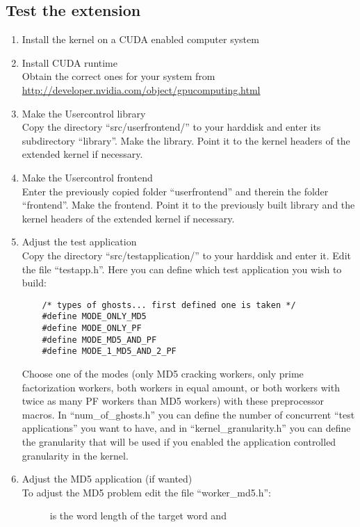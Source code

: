 \subsection{Test the extension}
\begin{enumerate}
\item  Install the kernel on a CUDA enabled computer system
\item  Install CUDA runtime\\
  Obtain the correct
  ones for your system from \url{http://developer.nvidia.com/object/gpucomputing.html}
\item  Make the Usercontrol library\\
  Copy the directory ``src/userfrontend/'' to your harddisk and enter its
  subdirectory ``library''. Make the library. Point it to the kernel headers of
  the extended kernel if necessary.
\item  Make the Usercontrol frontend\\
  Enter the previously copied folder ``userfrontend'' and therein the folder
  ``frontend''. Make the frontend. Point it to the previously built library and
  the kernel headers of the extended kernel if necessary.
\item  Adjust the test application\\
  Copy the directory ``src/testapplication/'' to your harddisk and enter it.
  Edit the file ``testapp.h''. Here you can define which test application you
  wish to build:
	\begin{verbatim}
    /* types of ghosts... first defined one is taken */
    #define MODE_ONLY_MD5
    #define MODE_ONLY_PF
    #define MODE_MD5_AND_PF
    #define MODE_1_MD5_AND_2_PF
	\end{verbatim}
  Choose one of the modes (only MD5 cracking workers, only prime factorization
  workers, both workers in equal amount, or both workers with twice as many
  PF workers than MD5 workers) with these preprocessor macros.
  In ``num\_of\_ghosts.h'' you can define the number of concurrent ``test
  applications'' you want to have, and in ``kernel\_granularity.h'' you can define
  the granularity that will be used if you enabled the application controlled
  granularity in the kernel.
\item  Adjust the MD5 application (if wanted)\\
  To adjust the MD5 problem edit the file ``worker\_md5.h'':
	\begin{description}
		\item[] is the word length of the target word and 

\end{description}
\end{enumerate}
